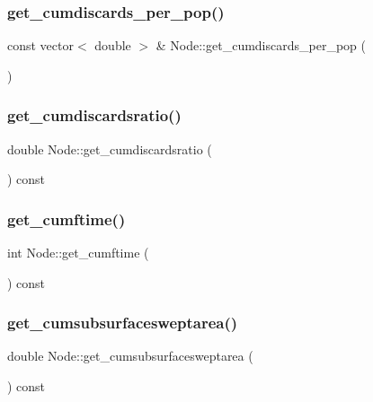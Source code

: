 \mbox{\label{class_node_afe99b34019a6b5f39e92df5bb3138f28}} 
\subsubsection{\texorpdfstring{get\_cumdiscards\_per\_pop()}{get\_cumdiscards\_per\_pop()}}
{\footnotesize\ttfamily const vector$<$ double $>$ \& Node\+::get\+\_\+cumdiscards\+\_\+per\+\_\+pop (\begin{DoxyParamCaption}{ }\end{DoxyParamCaption})}

\mbox{\label{class_node_afb29c4e3c3d6045bc2199fbac542c5bf}} 
\subsubsection{\texorpdfstring{get\_cumdiscardsratio()}{get\_cumdiscardsratio()}}
{\footnotesize\ttfamily double Node\+::get\+\_\+cumdiscardsratio (\begin{DoxyParamCaption}{ }\end{DoxyParamCaption}) const}

\mbox{\label{class_node_a349c14569cdd3f3b9ac6fd266d15cf0d}} 
\subsubsection{\texorpdfstring{get\_cumftime()}{get\_cumftime()}}
{\footnotesize\ttfamily int Node\+::get\+\_\+cumftime (\begin{DoxyParamCaption}{ }\end{DoxyParamCaption}) const}

\mbox{\label{class_node_a845670749959d4c932a8bbb4be78ffe8}} 
\subsubsection{\texorpdfstring{get\_cumsubsurfacesweptarea()}{get\_cumsubsurfacesweptarea()}}
{\footnotesize\ttfamily double Node\+::get\+\_\+cumsubsurfacesweptarea (\begin{DoxyParamCaption}{ }\end{DoxyParamCaption}) const}

